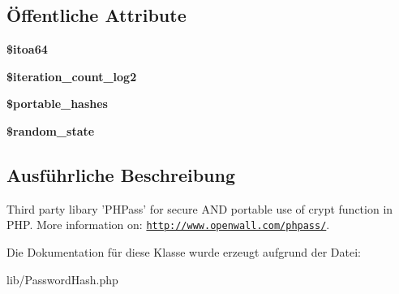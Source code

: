 \subsection*{Öffentliche \-Attribute}
\begin{DoxyCompactItemize}
\item 
\hypertarget{classPasswordHash_a8593373825df66f8c43701971da8582e}{{\bfseries \$itoa64}}\label{classPasswordHash_a8593373825df66f8c43701971da8582e}

\item 
\hypertarget{classPasswordHash_a7a6f6ec4b5780308ff0f6104ff7c6525}{{\bfseries \$iteration\-\_\-count\-\_\-log2}}\label{classPasswordHash_a7a6f6ec4b5780308ff0f6104ff7c6525}

\item 
\hypertarget{classPasswordHash_a26129b120196d909e280f4a899c8e60c}{{\bfseries \$portable\-\_\-hashes}}\label{classPasswordHash_a26129b120196d909e280f4a899c8e60c}

\item 
\hypertarget{classPasswordHash_aacc4932dcb4eba0425894dc9e09809bd}{{\bfseries \$random\-\_\-state}}\label{classPasswordHash_aacc4932dcb4eba0425894dc9e09809bd}

\end{DoxyCompactItemize}


\subsection{\-Ausführliche \-Beschreibung}
\-Third party libary '\-P\-H\-Pass' for secure \-A\-N\-D portable use of crypt function in \-P\-H\-P. \-More information on\-: \href{http://www.openwall.com/phpass/}{\tt http\-://www.\-openwall.\-com/phpass/}. 

\-Die \-Dokumentation für diese \-Klasse wurde erzeugt aufgrund der \-Datei\-:\begin{DoxyCompactItemize}
\item 
lib/\-Password\-Hash.\-php\end{DoxyCompactItemize}
